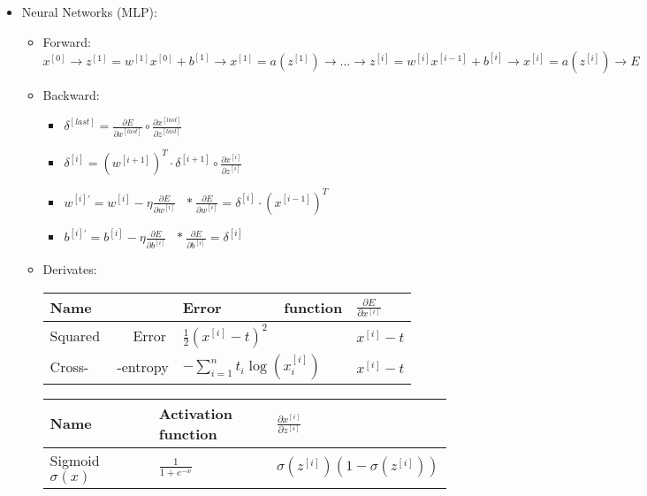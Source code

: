 \documentclass[twocolumn, 10pt]{article}
\begin{document}
\begin{itemize}[leftmargin=*, itemsep=0pt]
    \item Neural Networks (MLP):
    \begin{itemize}[topsep=0pt]
        \item Forward: $x^{[0]}\rightarrow z^{[1]}=w^{[1]}x^{[0]}+b^{[1]}\rightarrow x^{[1]}=a\left(z^{[1]}\right) \rightarrow \ldots \rightarrow z^{[i]}=w^{[i]}x^{[i-1]}+b^{[i]} \rightarrow x^{[i]}=a\left(z^{[i]}\right) \rightarrow E $
        \item Backward:
        \begin{itemize}[topsep=0pt, itemsep=3pt]
            \item $\displaystyle \delta^{[last]}=\frac{\partial E}{\partial x^{[last]}}\circ \frac{\partial x^{[last]}}{\partial z^{[last]}}$
            \item $\displaystyle \delta^{[i]}=\left(w^{[i+1]}\right)^T\cdot\delta^{[i+1]}\circ\frac{\partial x^{[i]}}{\partial z^{[i]}}$
            \item $\displaystyle w^{[i]'}=w^{[i]}-\eta\frac{\partial E}{\partial w^{[i]}}$ \;\;\;\, $*\ \displaystyle \frac{\partial E}{\partial w^{[i]}}=\delta^{[i]}\cdot \left(x^{[i-1]}\right)^T$
            \item $\displaystyle b^{[i]'}=b^{[i]}-\eta\frac{\partial E}{\partial b^{[i]}}$ \;\;\;\;\;\;\;\  $*\ \displaystyle \frac{\partial E}{\partial b^{[i]}}=\delta^{[i]}$
        \end{itemize}
        \newpage
        \item Derivates: \\[3pt]
        {\renewcommand{\arraystretch}{1.6}
        \begin{tabular}{ | M{6em} | M{8em} | M{7em} | } \hline
            Name & Error \ \ \ \ \ \ \ function & $\displaystyle \frac{\partial E}{\partial x^{[i]}}$ \\\hline
            Squared \ \ \ \ Error & $\displaystyle\frac{1}{2}\left(x^{[i]}-t\right)^2$ & $x^{[i]}-t$ \\\hline
            Cross-\ \ \ \ -entropy & $\displaystyle-\sum_{i=1}^{n}t_{i}\log\left(x_{i}^{[i]}\right)$ & $x^{[i]}-t$ \\\hline
        \end{tabular}}
        {\renewcommand{\arraystretch}{1.6}
        \begin{tabular}{ | M{6em} | M{6em} | M{9em} | } \hline
            Name & Activation function & $\displaystyle \frac{\partial x^{[i]}}{\partial z^{[i]}}$ \\\hline
            Sigmoid \ \ \ \ $\sigma\left(x\right)$ & $\displaystyle \frac{1}{1+e^{-x}}$ & $\sigma\left(z^{[i]}\right)\left(1-\sigma\left(z^{[i]}\right)\right)$ \\\hline

\end{tabular}}
\end{itemize}
\end{itemize}
\end{document}
